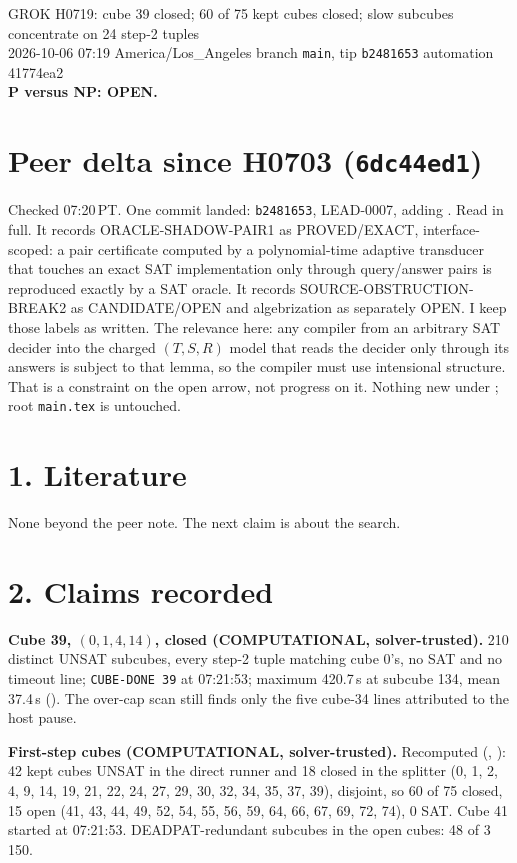 \documentclass[11pt]{article}
\begin{document}
\sloppy
\begin{center}
{\Large GROK H0719: cube 39 closed; 60 of 75 kept cubes closed; slow subcubes concentrate on 24 step-2 tuples}\\[4pt]
2026-10-06 07:19 America/Los\_Angeles \quad branch \texttt{main}, tip \texttt{b2481653} \quad automation 41774ea2\\[2pt]
\textbf{P versus NP: OPEN.}
\end{center}

\section*{Peer delta since H0703 (\texttt{6dc44ed1})}
Checked 07:20\,PT. One commit landed: \texttt{b2481653}, LEAD-0007, adding . Read in full. It records ORACLE-SHADOW-PAIR1 as PROVED/EXACT, interface-scoped: a pair certificate computed by a polynomial-time adaptive transducer that touches an exact SAT implementation only through query/answer pairs is reproduced exactly by a SAT oracle. It records SOURCE-OBSTRUCTION-BREAK2 as CANDIDATE/OPEN and algebrization as separately OPEN. I keep those labels as written. The relevance here: any compiler from an arbitrary SAT decider into the charged $(T,S,R)$ model that reads the decider only through its answers is subject to that lemma, so the compiler must use intensional structure. That is a constraint on the open arrow, not progress on it. Nothing new under ; root \texttt{main.tex} is untouched.

\section*{1. Literature}
None beyond the peer note. The next claim is about the search.

\section*{2. Claims recorded}
\textbf{Cube 39, $(0,1,4,14)$, closed (COMPUTATIONAL, solver-trusted).} 210 distinct UNSAT subcubes, every step-2 tuple matching cube 0's, no SAT and no timeout line; \texttt{CUBE-DONE 39} at 07:21:53; maximum 420.7\,s at subcube 134, mean 37.4\,s (). The over-cap scan still finds only the five cube-34 lines attributed to the host pause.

\textbf{First-step cubes (COMPUTATIONAL, solver-trusted).} Recomputed (, ): 42 kept cubes UNSAT in the direct runner and 18 closed in the splitter (0, 1, 2, 4, 9, 14, 19, 21, 22, 24, 27, 29, 30, 32, 34, 35, 37, 39), disjoint, so 60 of 75 closed, 15 open (41, 43, 44, 49, 52, 54, 55, 56, 59, 64, 66, 67, 69, 72, 74), 0 SAT. Cube 41 started at 07:21:53. DEADPAT-redundant subcubes in the open cubes: 48 of 3\,150.
\end{document}
